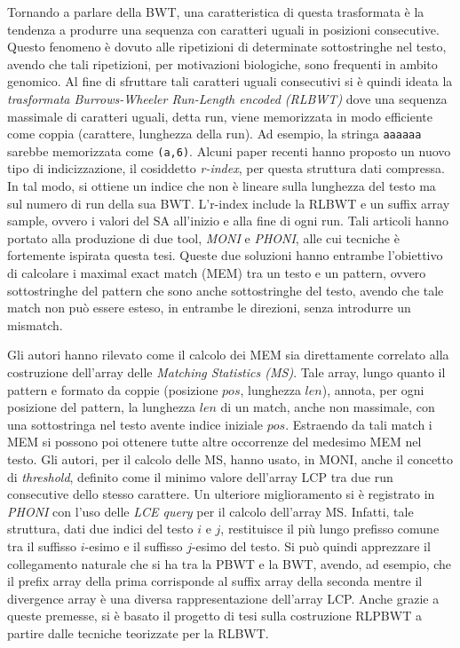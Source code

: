 \documentclass[a4paper,11pt, oneside,italian]{article}
\begin{document}
Tornando a parlare della BWT, una caratteristica di questa trasformata è la
tendenza a produrre una sequenza con caratteri uguali in posizioni
consecutive. Questo fenomeno è dovuto alle ripetizioni di determinate
sottostringhe nel testo, avendo che tali ripetizioni, per motivazioni
biologiche, sono frequenti in ambito genomico.
Al fine di sfruttare tali caratteri uguali consecutivi si 
è quindi ideata la \textit{trasformata Burrows-Wheeler Run-Length
  encoded (RLBWT)} dove una sequenza massimale di caratteri uguali, detta 
run, viene memorizzata in modo efficiente come coppia (carattere,
lunghezza della run). Ad esempio, la stringa \texttt{aaaaaa} sarebbe memorizzata
come \texttt{(a,6)}.
Alcuni paper recenti hanno proposto un nuovo tipo di
indicizzazione, il cosiddetto \textit{r-index}, per questa struttura
dati compressa. In tal modo, si ottiene un indice che non è lineare sulla
lunghezza del testo ma sul numero di run della sua BWT. L'r-index include la
RLBWT e un suffix array sample, ovvero i valori del SA all’inizio e alla fine di
ogni run. 
Tali articoli hanno portato alla produzione di due tool, \textit{MONI} e 
\textit{PHONI}, alle cui tecniche è fortemente ispirata questa tesi. Queste due
soluzioni hanno entrambe l'obiettivo di 
calcolare i maximal exact match (MEM) tra un testo e un pattern, ovvero
sottostringhe del pattern che 
sono anche sottostringhe del testo, avendo che tale match non può essere esteso,
in entrambe le direzioni, senza introdurre un mismatch. 

Gli autori hanno rilevato come il calcolo dei MEM sia direttamente
correlato alla costruzione dell'array delle \textit{Matching Statistics (MS)}.
Tale array, lungo quanto il pattern e formato da coppie (posizione $pos$,
lunghezza $len$), annota, per ogni posizione del pattern, la lunghezza $len$ di
un match, anche non massimale, con una sottostringa nel testo avente
indice iniziale $pos$. Estraendo da tali match i MEM si possono poi ottenere
tutte altre occorrenze del medesimo MEM nel testo. 
Gli autori, per il calcolo delle MS, hanno
usato, in MONI, anche il concetto di \textit{threshold}, definito come
il minimo valore dell'array LCP tra due run consecutive dello stesso
carattere. Un ulteriore miglioramento si è registrato in \textit{PHONI} con
l'uso delle \textit{LCE query} per il calcolo dell'array MS. Infatti, tale
struttura, dati due indici del testo $i$ e $j$, restituisce il più lungo
prefisso comune tra il suffisso $i$-esimo e il suffisso $j$-esimo del testo.
Si può quindi apprezzare il collegamento naturale che si ha tra la PBWT
e la BWT, avendo, ad esempio, che il prefix array della prima corrisponde
al suffix array della seconda mentre il divergence array è una
diversa rappresentazione dell'array LCP. Anche grazie a queste premesse, si è
basato il progetto di tesi sulla costruzione RLPBWT a partire dalle tecniche
teorizzate per la RLBWT.
\end{document}
